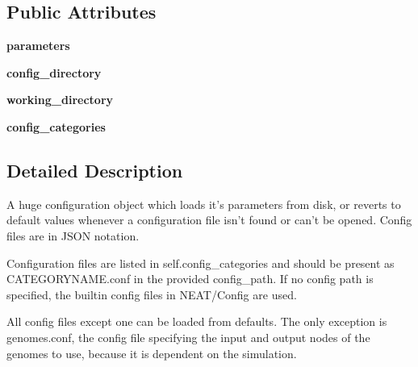 \subsection*{Public Attributes}
\begin{DoxyCompactItemize}
\item 
{\bfseries parameters}\hypertarget{class_n_e_a_t___py_genetics_1_1_n_e_a_t_1_1_config_1_1_n_e_a_t_config_1_1_n_e_a_t_config_a04ae4f640ee3d8a9dadbbe0a293bb3d6}{}\label{class_n_e_a_t___py_genetics_1_1_n_e_a_t_1_1_config_1_1_n_e_a_t_config_1_1_n_e_a_t_config_a04ae4f640ee3d8a9dadbbe0a293bb3d6}

\item 
{\bfseries config\+\_\+directory}\hypertarget{class_n_e_a_t___py_genetics_1_1_n_e_a_t_1_1_config_1_1_n_e_a_t_config_1_1_n_e_a_t_config_ae3bd7eb4a5b4ad753d5c2de3c70aed06}{}\label{class_n_e_a_t___py_genetics_1_1_n_e_a_t_1_1_config_1_1_n_e_a_t_config_1_1_n_e_a_t_config_ae3bd7eb4a5b4ad753d5c2de3c70aed06}

\item 
{\bfseries working\+\_\+directory}\hypertarget{class_n_e_a_t___py_genetics_1_1_n_e_a_t_1_1_config_1_1_n_e_a_t_config_1_1_n_e_a_t_config_ac88a0f28d412192f52a5cb55935beaa4}{}\label{class_n_e_a_t___py_genetics_1_1_n_e_a_t_1_1_config_1_1_n_e_a_t_config_1_1_n_e_a_t_config_ac88a0f28d412192f52a5cb55935beaa4}

\item 
{\bfseries config\+\_\+categories}\hypertarget{class_n_e_a_t___py_genetics_1_1_n_e_a_t_1_1_config_1_1_n_e_a_t_config_1_1_n_e_a_t_config_a1e2b0edc6558d673c7f7a197d2faa72e}{}\label{class_n_e_a_t___py_genetics_1_1_n_e_a_t_1_1_config_1_1_n_e_a_t_config_1_1_n_e_a_t_config_a1e2b0edc6558d673c7f7a197d2faa72e}

\end{DoxyCompactItemize}


\subsection{Detailed Description}
\begin{DoxyVerb}A huge configuration object which loads it's parameters
from disk, or reverts to default values whenever a
configuration file isn't found or can't be opened.
Config files are in JSON notation.

Configuration files are listed in self.config_categories
and should be present as CATEGORYNAME.conf in the
provided config_path. If no config path is specified, the builtin
config files in NEAT/Config are used.

All config files except one can be loaded from defaults.
The only exception is genomes.conf, the config file specifying
the input and output nodes of the genomes to use, because it
is dependent on the simulation.
\end{DoxyVerb}
 

